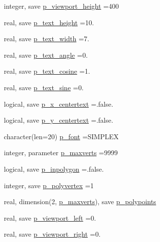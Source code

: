 \begin{DoxyCompactItemize}
\item 
integer, save \mbox{\hyperlink{namespacem__pixel_acf14b658781bda49f8d06960898145e1}{p\+\_\+viewport\+\_\+height}} =400
\item 
real, save \mbox{\hyperlink{namespacem__pixel_a537c6094f5f61e3244c7e380824f303e}{p\+\_\+text\+\_\+height}} =10.
\item 
real, save \mbox{\hyperlink{namespacem__pixel_adc146e2cd2855f33422e2c11ca1ba7ce}{p\+\_\+text\+\_\+width}} =7.
\item 
real, save \mbox{\hyperlink{namespacem__pixel_a3b1c231e0814986c5d095cbd4297c816}{p\+\_\+text\+\_\+angle}} =0.
\item 
real, save \mbox{\hyperlink{namespacem__pixel_a85337ee8045620104d3dc7c63cc0cbdb}{p\+\_\+text\+\_\+cosine}} =1.
\item 
real, save \mbox{\hyperlink{namespacem__pixel_afa488842d93c6af90f0acc87f36c8a84}{p\+\_\+text\+\_\+sine}} =0.
\item 
logical, save \mbox{\hyperlink{namespacem__pixel_afbac34f0dc57e0da0666b52c238ea37c}{p\+\_\+x\+\_\+centertext}} =.false.
\item 
logical, save \mbox{\hyperlink{namespacem__pixel_a7f2859a8ac00324dff9d055b83bd17d2}{p\+\_\+y\+\_\+centertext}} =.false.
\item 
character(len=20) \mbox{\hyperlink{namespacem__pixel_a06bbf83bc5125cad5aba0af267af0e18}{p\+\_\+font}} =\textquotesingle{}S\+I\+M\+P\+L\+EX\textquotesingle{}
\item 
integer, parameter \mbox{\hyperlink{namespacem__pixel_ac1b53fdfda87eb9ede10e72973344e25}{p\+\_\+maxverts}} =9999
\item 
logical, save \mbox{\hyperlink{namespacem__pixel_a1911f94cdfa5a7c08ff32a696d2ea51e}{p\+\_\+inpolygon}} =.false.
\item 
integer, save \mbox{\hyperlink{namespacem__pixel_ac0759567a2205be55bc4c9b8b7b6d5d5}{p\+\_\+polyvertex}} =1
\item 
real, dimension(2, \mbox{\hyperlink{namespacem__pixel_ac1b53fdfda87eb9ede10e72973344e25}{p\+\_\+maxverts}}), save \mbox{\hyperlink{namespacem__pixel_ab5c7f104a86e11630f363a26a1cb7067}{p\+\_\+polypoints}}
\item 
real, save \mbox{\hyperlink{namespacem__pixel_aa5806ca65801efd8c0e6753be81847d6}{p\+\_\+viewport\+\_\+left}} =0.
\item 
real, save \mbox{\hyperlink{namespacem__pixel_a85587aae427d1f08e1f835dc6756b121}{p\+\_\+viewport\+\_\+right}} =0.
\item 

\end{DoxyCompactItemize}
